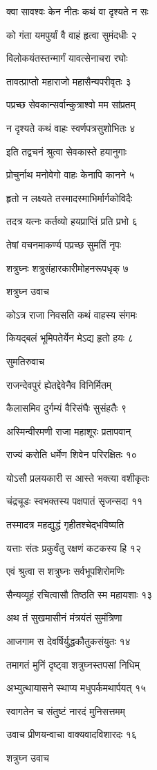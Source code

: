 क्वा सावश्वः केन नीतः कथं वा दृश्यते न सः

को गंता यमपुर्यां वै वाहं हृत्वा सुमंदधीः २

विलोकयंतस्तन्मार्गं यावत्सेनाचरा रघोः

तावत्प्राप्तो महाराजो महासैन्यपरीवृतः ३

पप्रच्छ सेवकान्सर्वान्कुत्राश्वो मम सांप्रतम्

न दृश्यते कथं वाहः स्वर्णपत्रसुशोभितः ४

इति तद्वचनं श्रुत्वा सेवकास्ते हयानुगाः

प्रोचुर्नाथ मनोवेगो वाहः केनापि कानने ५

हृतो न लक्ष्यते तस्मादस्माभिर्मार्गकोविदैः

तदत्र यत्नः कर्तव्यो हयप्राप्तिं प्रति प्रभो ६

तेषां वचनमाकर्ण्य पप्रच्छ सुमतिं नृपः

शत्रुघ्नः शत्रुसंहारकारीमोहनरूपधृक् ७

शत्रुघ्न उवाच

कोऽत्र राजा निवसति कथं वाहस्य संगमः

कियद्बलं भूमिपतेर्येन मेऽद्य हृतो हयः ८

सुमतिरुवाच

राजन्देवपुरं ह्येतद्देवेनैव विनिर्मितम्

कैलासमिव दुर्गम्यं वैरिसंघैः सुसंहतैः ९

अस्मिन्वीरमणी राजा महाशूरः प्रतापवान्

राज्यं करोति धर्मेण शिवेन परिरक्षितः १०

योऽसौ प्रलयकारी स आस्ते भक्त्या वशीकृतः

चंद्रचूडः स्वभक्तस्य पक्षपातं सृजन्सदा ११

तस्मादत्र महद्युद्धं गृहीतश्चेद्भविष्यति

यत्ताः संतः प्रकुर्वंतु रक्षणं कटकस्य हि १२

एवं श्रुत्वा स शत्रुघ्नः सर्वभूपशिरोमणिः

सैन्यव्यूहं रचित्वासौ तिष्ठति स्म महायशाः १३

अथ तं सुखमासीनं मंत्रयंतं सुमंत्रिणा

आजगाम स देवर्षिर्युद्धकौतुकसंयुतः १४

तमागतं मुनिं दृष्ट्वा शत्रुघ्नस्तपसां निधिम्

अभ्युत्थायासने स्थाप्य मधुपर्कमथार्पयत् १५

स्वागतेन च संतुष्टं नारदं मुनिसत्तमम्

उवाच प्रीणयन्वाचा वाक्यवादविशारदः १६

शत्रुघ्न उवाच

